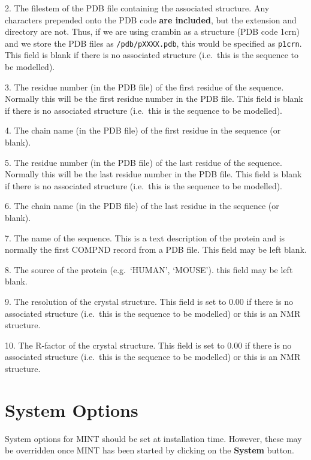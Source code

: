 \documentclass[12pt]{article}
\begin{document}
2. The filestem of the PDB file containing the associated
structure. Any characters prepended onto the PDB code {\bfseries are included},
but the extension and directory are not. Thus, if we are using crambin
as a structure (PDB code 1crn) and we store the PDB files as
{\tt /pdb/pXXXX.pdb}, this would be specified as {\tt p1crn}. This field is
blank if there is no associated structure (i.e.\ this is the sequence
to be modelled).

3. The residue number (in the PDB file) of the first residue of the
sequence. Normally this will be the first residue number in the PDB
file. This field is blank if there is no associated structure
(i.e.\ this is the sequence to be modelled).

4. The chain name (in the PDB file) of the first residue in the
sequence (or blank).

5. The residue number (in the PDB file) of the last residue of the
sequence. Normally this will be the last residue number in the PDB
file. This field is blank if there is no associated structure
(i.e.\ this is the sequence to be modelled).

6. The chain name (in the PDB file) of the last residue in the
sequence (or blank).

7. The name of the sequence. This is a text description of the protein
and is normally the first COMPND record from a PDB file. This field
may be left blank.

8. The source of the protein (e.g.\ `HUMAN', `MOUSE'). this field may
be left blank.

9. The resolution of the crystal structure. This field is set to 0.00
if there is no associated structure (i.e.\ this is the sequence to be
modelled) or this is an NMR structure.

10. The R-factor of the crystal structure. This field is set to 0.00
if there is no associated structure (i.e.\ this is the sequence to be
modelled) or this is an NMR structure.









\section{System Options}
\label{app:system}
System options for MINT should be set at installation time. However, these
may be overridden once MINT has been started by clicking on the
{\bfseries System} button.
\vspace{1em}
\end{document}
